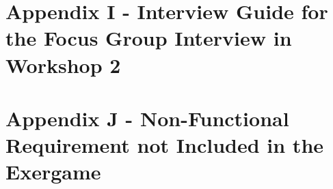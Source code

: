 \section*{Appendix I - Interview Guide for the Focus Group Interview in Workshop 2}
\label{app:interviewGuide2}
\begin{figure}[H] 
\end{figure}

\newpage
\section*{Appendix J - Non-Functional Requirement not Included in the Exergame}

